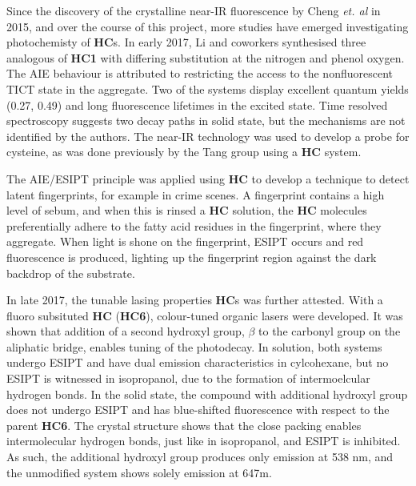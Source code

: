 Since the discovery of the crystalline near-IR fluorescence by Cheng \textit{et. al} in 2015, and over the course of this project, more studies have emerged investigating photochemisty of \textbf{HC}s. %
In early 2017, Li and coworkers synthesised three analogous of \textbf{HC1} with differing substitution at the nitrogen and phenol oxygen.\cite{Li2017a} The AIE behaviour is attributed to restricting the access to the nonfluorescent \ac{TICT} state in the aggregate. Two of the systems display excellent quantum yields (0.27, 0.49) and long fluorescence lifetimes in the excited state. Time resolved spectroscopy suggests two decay paths in solid state, but the mechanisms are not identified by the authors. The near-IR technology was used to develop a probe for cysteine, as was done previously by the Tang group using a \textbf{HC} system.\cite{Song2014} 

The \ac{AIE}/\ac{ESIPT} principle was applied using \textbf{HC} to develop a technique to detect latent fingerprints, for example in crime scenes.\cite{Jin2015} A fingerprint contains a high level of sebum, and when this is rinsed a \textbf{HC} solution, the \textbf{HC} molecules preferentially adhere to the fatty acid residues in the fingerprint, where they aggregate. When light is shone on the fingerprint, \ac{ESIPT} occurs and red fluorescence is produced, lighting up the fingerprint region against the dark backdrop of the substrate.  

In late 2017, the tunable lasing properties \textbf{HC}s was further attested.\cite{Li2017d} With a fluoro subsituted \textbf{HC} (\textbf{HC6}), colour-tuned organic lasers were developed. It was shown that addition of a second hydroxyl group, $\beta$ to the carbonyl group on the aliphatic bridge, enables tuning of the photodecay. In solution, both systems undergo ESIPT and have dual emission characteristics in cylcohexane, but no ESIPT is witnessed in isopropanol, due to the formation of intermoelcular hydrogen bonds. In the solid state, the compound with additional hydroxyl group does not undergo ESIPT and has blue-shifted fluorescence with respect to the parent \textbf{HC6}. The crystal structure shows that the close packing enables intermolecular hydrogen bonds, just like in isopropanol, and ESIPT is inhibited. As such, the additional hydroxyl group produces only \Estar{} emission at 538 nm, and the unmodified system shows solely \Kstar{} emission at 647m. 

